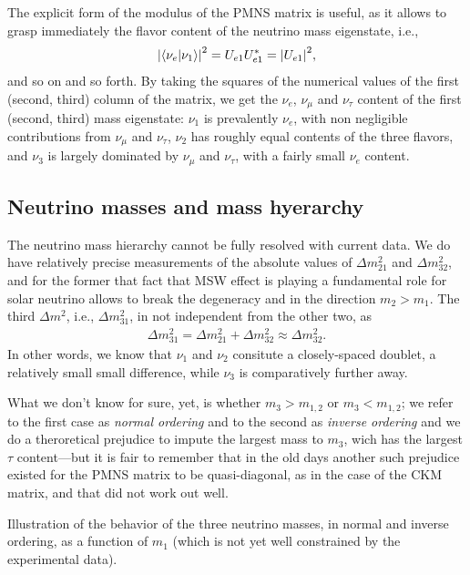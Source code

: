 The explicit form of the modulus of the PMNS matrix is useful, as it allows to grasp
immediately the flavor content of the neutrino mass eigenstate, i.e.,
\begin{align}
  \abs{\braket{\nu_e}{\nu_1}}^2 = U_{e1}U^*_{e1} = \abs{U_{e1}}^2,
\end{align}
and so on and so forth. By taking the squares of the numerical values of the first
(second, third) column of the matrix, we get the $\nu_e$,  $\nu_\mu$ and $\nu_\tau$
content of the first (second, third) mass eigenstate: $\nu_1$ is prevalently $\nu_e$,
with non negligible contributions from $\nu_\mu$ and $\nu_\tau$, $\nu_2$ has roughly
equal contents of the three flavors, and $\nu_3$ is largely dominated by $\nu_\mu$
and $\nu_\tau$, with a fairly small $\nu_e$ content.


\subsection{Neutrino masses and mass hyerarchy}

The neutrino mass hierarchy cannot be fully resolved with current data. We do have
relatively precise measurements of the absolute values of $\Delta m^2_{21}$ and
$\Delta m^2_{32}$, and for the former that fact that MSW effect is playing a fundamental
role for solar neutrino allows to break the degeneracy and in the direction $m_2 > m_1$.
The third $\Delta m^2$, i.e., $\Delta m^2_{31}$, in not independent from the other
two, as
\begin{align*}
  \Delta m^2_{31} = \Delta m^2_{21} + \Delta m^2_{32} \approx \Delta m^2_{32}.
\end{align*}
In other words, we know that $\nu_1$ and $\nu_2$ consitute a closely-spaced doublet,
a relatively small small difference, while $\nu_3$ is comparatively further away.

What we don't know for sure, yet, is whether  $m_3 > m_{1,2}$ or $m_3 < m_{1,2}$;
we refer to the first case as \emph{normal ordering} and to the second as
\emph{inverse ordering} and we do a theroretical prejudice to impute the largest
mass to $m_3$, wich has the largest $\tau$ content---but it is fair to remember that
in the old days another such prejudice existed for the PMNS matrix to be quasi-diagonal,
as in the case of the CKM matrix, and that did not work out well.

\begin{marginfigure}
  
  \caption{Illustration of the behavior of the three neutrino masses, in normal and
  inverse ordering, as a function of $m_1$ (which is not yet well constrained by the
  experimental data).}
  \label{fig:neutrino_mass_scale}
\end{marginfigure}

